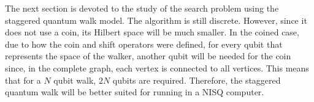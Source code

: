 \documentclass[../../dissertation.tex]{subfiles}
\begin{document}
The next section is devoted to the study of the search problem using the
staggered quantum walk model. The algorithm is still discrete. However, since it
does not use a coin, its Hilbert space will be much smaller. In the coined
case, due to how the coin and shift operators were defined, for every qubit
that represents the space of the walker, another qubit will be needed for the
coin since, in the complete graph, each vertex is connected to all vertices. This means that for a $N$ qubit walk, $2N$ qubits are required.
Therefore, the staggered quantum walk will be better suited for running in a
NISQ computer.
\end{document}
